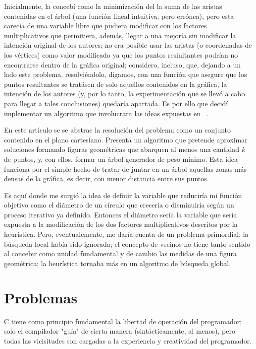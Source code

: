 \documentclass[a4paper]{report}
\begin{document}
  Inicialmente, la conceb\'i como la minimizaci\'on del la suma de las aristas contenidas en el
  \'arbol (una funci\'on lineal intuitiva, pero err\'onea), pero esta carec\'ia de una variable
  libre que pudiera modificar con los factores multiplicativos que permitiera, adem\'as, llegar
  a una mejor\'ia sin modificar la intenci\'on original de los autores; no era posible usar las
  aristas (o coordenadas de los v\'ertices) como valor modificado ya que los puntos resiultantes
  podr\'ian no encontrarse dentro de la gr\'afica original; considero, incluso, que, dejando a
  un lado este problema, resolvi\'endolo, digamos, con una funci\'on que asegure que los puntos
  resultantes se trat\'asen de solo aquellos contenidos en la gr\'afica, la intenci\'on de los
  autores (y, por lo tanto, la experimentaci\'on que se llev\'o a cabo para llegar a tales
  conclusiones) quedar\'ia apartada. Es por ello que decid\'i implementar un algoritmo que
  involucrara las ideas expuestas en ~\cite{ravi}.

  En este art\'iculo se se abstrae la resoluci\'on del problema como un conjunto contenido en el
  plano cartesiano. Presenta un algoritmo que pretende aproximar soluciones formando figuras geom\'etricas
  que abarquen al menos una cantidad \textit{k} de puntos, y, con ellos, formar un \'arbol generador
  de peso m\'inimo. Esta idea funciona por el simple hecho de tratar de juntar en un \'arbol aquellas zonas
  m\'as densas de la gr\'afica, es decir, con menor distancia entre sus puntos.

  Es aqu\'i donde me surgi\'o la idea de definir la variable que reducir\'ia mi funci\'on objetivo como
  el di\'ametro de un c\'irculo que crecer\'ia o disminuir\'ia seg\'un un proceso iterativo ya definido.
  Entonces el di\'ametro ser\'ia la variable que ser\'ia expuesta a la modificaci\'on de los dos factores
  multiplicativos descritos por la heur\'istica. Pero, eventualemente, me dar\'ia cuenta de un problema
  primordial: la b\'usqueda local hab\'ia sido ignorada; el concepto de vecinos no tiene tanto sentido
  al concebir como unidad fundamental y de cambio las medidas de una figura geom\'etrica; la heur\'istica
  tornaba m\'as en un algoritmo de b\'usqueda global.

  \section{Problemas}
  C tiene como principio fundamental la libertad de operaci\'on del programador; solo el
  compilador "gu\'ia" de cierta manera (sint\'acticamente, al menos), pero todas las
  vicisitudes son cargadas a la experiencia y creatividad del programador.
\end{document}
